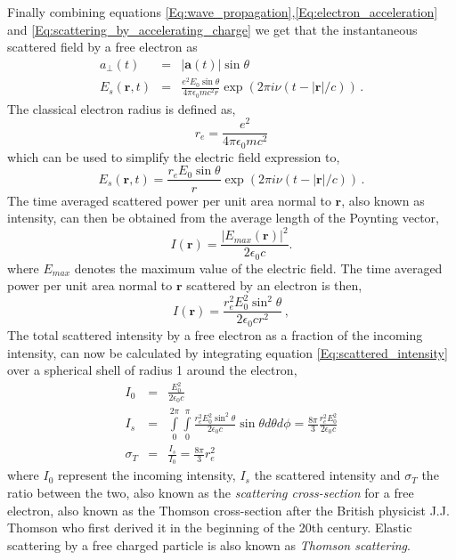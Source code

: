 Finally combining equations \ref{Eq:wave_propagation},\ref{Eq:electron_acceleration} and \ref{Eq:scattering_by_accelerating_charge} we get that the instantaneous scattered field by a free electron as
\begin{eqnarray}
a_{\perp}(t) & = & |\mathbf a(t)| \sin \theta  \\
E_s(\mathbf r,t) & = & \frac{e^2 E_0 \sin \theta }{4 \pi \epsilon_0 m c^2 r}
\exp(2 \pi i \nu (t -| \mathbf r|/c)) \, . 
\label{Eq:scattering_by_electron}
\end{eqnarray}
The classical electron radius is defined as,
\begin{equation}
r_e = \frac{e^2}{4 \pi \epsilon_0 m c^2}
\end{equation}
which can be used to simplify the electric field expression to,
\begin{equation}
E_s(\mathbf r,t) = \frac{r_e E_0 \sin \theta }{r} \exp(2 \pi i \nu (t -| \mathbf
r|/c))  \, .
\label{Eq:scattering_by_electron_simplified}
\end{equation}
The time averaged scattered power per unit area normal to $\mathbf r$, also
known as intensity, can then be obtained from the average length of the Poynting vector,
\begin{equation} 
I(\mathbf r) = \frac{ |E_{max}(\mathbf r)|^2 }{2 \epsilon_0 c} .
\label{Eq:poynting_vector}
\end{equation}
where $E_{max}$ denotes the maximum value of the electric field.
The time averaged power per unit area normal to $\mathbf r$ scattered by an electron is then,
\begin{equation}
I(\mathbf r)  = \frac{r_e^2 E_0^2 \sin^2 \theta }{2 \epsilon_0 c r^2} \, ,
\label{Eq:scattered_intensity}
\end{equation}
The total scattered intensity by a free electron as a fraction of the incoming
intensity, can now be calculated by integrating equation
\ref{Eq:scattered_intensity} over a spherical shell of radius 1 around the electron,
\begin{eqnarray}
I_0 & = & \frac{E_0^2}{2 \epsilon_0 c} \\
I_s & = & \int\limits_0^{2 \pi} \int\limits_0^{\pi} \frac{r_e^2 E_0^2 \sin^2
  \theta }{2 \epsilon_0 c} \sin \theta d \theta d\phi = \frac{8 \pi}{3}
\frac{r_e^2 E_0^2}{2 \epsilon_0 c} \\
\sigma_T & = & \frac{I_s}{I_0} = \frac{8 \pi}{3} r_e^2
\end{eqnarray}
where $I_0$ represent the incoming intensity, $I_s$ the scattered intensity and
$\sigma_T$ the ratio between the two, also known as the {\em scattering cross-section}
for a free electron, also known as the Thomson cross-section after the British
physicist J.J. Thomson who first derived it in the beginning of the 20th
century. Elastic scattering by a free charged particle is also known as {\em Thomson scattering}.

